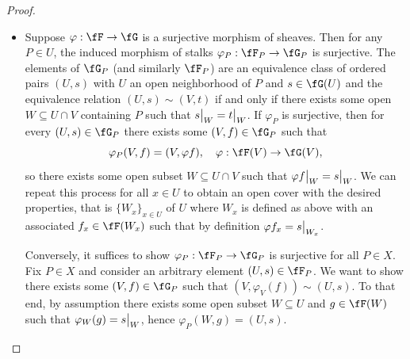 \documentclass[a4paper]{article}
\begin{document}
\begin{enumerate} [label=\textbf{\arabic*.}, leftmargin=0em]
          \begin{proof} $ $ \vspace{0pt}
              \begin{itemize} [leftmargin=0cm]
                  \item[(a)] Suppose $\varphi : \fF \to \fG$ is a surjective morphism of sheaves. Then for any $P \in U$, the induced morphism of stalks $\varphi_P : \fF_P \to \fG_P$ is surjective.
                        The elements of $\fG_P$ (and similarly $\fF_P$) are an equivalence class of ordered pairs $(U, s)$ with $U$ an open neighborhood of $P$ and $s \in \fG(U)$ and the equivalence relation $(U, s) \sim (V, t)$ if and only if there exists some open $W \subseteq U \cap V$ containing $P$ such that $\restr{s}{W} = \restr{t}{W}$. If $\varphi_P$ is surjective, then for every $(U, s) \in \fG_P$ there exists some $(V, f) \in \fG_P$ such that
                        \begin{equation*}
                            \varphi_P(V, f) = (V, \varphi  f), \quad \varphi : \fF(V) \to \fG(V),
                        \end{equation*}
                        so there exists some open subset $W \subseteq U \cap V$ such that $\restr{\varphi f}{W} = \restr{s}{W}$.
                        We can repeat this process for all $x \in U$ to obtain an open cover with the desired properties, that is $\{ W_x \}_{x \in U}$ of $U$ where $W_x$ is defined as above with an associated $f_x \in \fF(W_x)$ such that by definition $\varphi f_x = \restr{s}{W_x}$.

                        Conversely, it suffices to show $\varphi_P : \fF_P \to \fG_P$ is surjective for all $P \in X$.
                        Fix $P \in X$ and consider an arbitrary element $(U, s) \in \fF_P$.
                        We want to show there exists some $(V, f) \in \fG_P$ such that $(V, \varphi_V(f)) \sim (U, s)$.
                        To that end, by assumption there exists some open subset $W \subseteq U$ and $g \in \fF(W)$ such that $\varphi_W(g) = \restr{s}{W}$, hence $\varphi_P(W, g) = (U, s)$.


\end{itemize}
\end{proof}
\end{enumerate}
\end{document}
